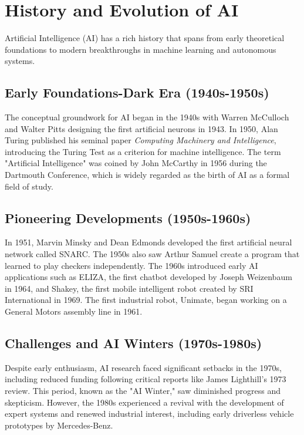 \section{History and Evolution of AI}
\label{sec:history-evolution-ai}

Artificial Intelligence (AI) has a rich history that spans from early
theoretical foundations to modern breakthroughs in machine learning and
autonomous systems.

\subsection*{Early Foundations-Dark Era (1940s-1950s)}
The conceptual groundwork for AI began in the 1940s with Warren McCulloch and
Walter Pitts designing the first artificial neurons in 1943. In 1950, Alan
Turing published his seminal paper \textit{Computing Machinery and
Intelligence}, introducing the Turing Test as a criterion for machine
intelligence. The term "Artificial Intelligence" was coined by John McCarthy in
1956 during the Dartmouth Conference, which is widely regarded as the birth of
AI as a formal field of study.

\subsection*{Pioneering Developments (1950s-1960s)}
In 1951, Marvin Minsky and Dean Edmonds developed the first artificial neural
network called SNARC. The 1950s also saw Arthur Samuel create a program that
learned to play checkers independently. The 1960s introduced early AI
applications such as ELIZA, the first chatbot developed by Joseph Weizenbaum in
1964, and Shakey, the first mobile intelligent robot created by SRI
International in 1969. The first industrial robot, Unimate, began working on a
General Motors assembly line in 1961.

\subsection*{Challenges and AI Winters (1970s-1980s)}
Despite early enthusiasm, AI research faced significant setbacks in the 1970s,
including reduced funding following critical reports like James Lighthill's 1973
review. This period, known as the "AI Winter," saw diminished progress and
skepticism. However, the 1980s experienced a revival with the development of
expert systems and renewed industrial interest, including early driverless
vehicle prototypes by Mercedes-Benz.


